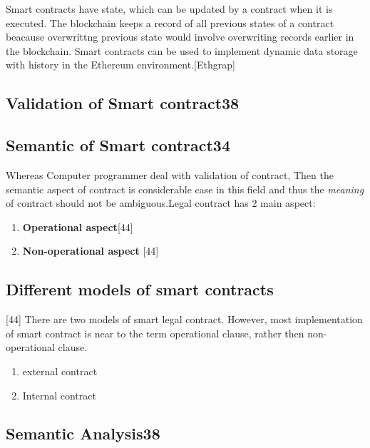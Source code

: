 Smart contracts have state, which can be updated by a contract when it is executed. The blockchain keeps a record of all previous states of a contract beacause overwrittng previous state would involve overwriting records earlier in the blockchain. Smart contracts can be used to implement dynamic data storage with history in the Ethereum environment.[Ethgrap]
   





\subsection{Validation of Smart contract38}

\subsection{Semantic of Smart contract34}

Whereas Computer programmer deal with validation of contract, Then the semantic aspect of contract is considerable case in this field and thus the \textit{meaning} of contract should not be ambiguous.Legal contract has 2 main aspect:
 \begin{enumerate}
 	
 	 \item \textbf{Operational aspect}[44]
 	 \item \textbf{Non-operational aspect} [44]
 	
 \end{enumerate}

\subsection{Different models of smart contracts}[44]
There are two models of smart legal contract. However, most implementation of smart contract is near to the term operational clause, rather then non-operational clause.
\begin{enumerate}
	\item external contract
	\item Internal contract
\end{enumerate}
\subsection{Semantic Analysis38}


